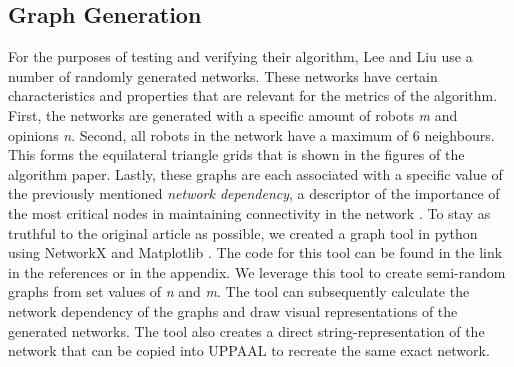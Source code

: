 \subsection{Graph Generation}
\label{subsec:GG}
For the purposes of testing and verifying their algorithm, Lee and Liu use a number of randomly generated networks. These networks have certain characteristics and properties that are relevant for the metrics of the algorithm. First, the networks are generated with a specific amount of robots \textit{m} and opinions \textit{n}. Second, all robots in the network have a maximum of 6 neighbours. This forms the equilateral triangle grids that is shown in the figures of the algorithm paper. Lastly, these graphs are each associated with a specific value of the previously mentioned \textit{network dependency}, a descriptor of the importance of the most critical nodes in maintaining connectivity in the network \parencite{AlgorithmPaper}. To stay as truthful to the original article as possible, we created a graph tool in python using NetworkX and Matplotlib \parencite{Hunter:2007, SciPyProceedings_11}. The code for this tool can be found in the link in the references \parencite{GraphTool} or in the appendix. We leverage this tool to create semi-random graphs from set values of \textit{n} and \textit{m}. The tool can subsequently calculate the network dependency of the graphs and draw visual representations of the generated networks. The tool also creates a direct string-representation of the network that can be copied into UPPAAL to recreate the same exact network.